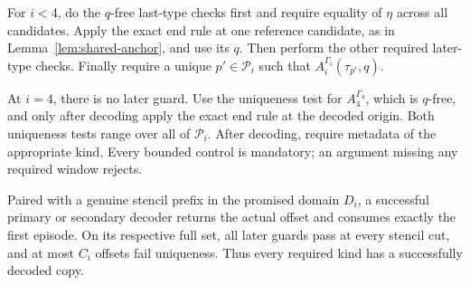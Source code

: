 For \(i<4\), do the \(q\)-free last-type checks first and require equality of
\(\eta\) across all candidates. Apply the exact end rule at one reference
candidate, as in Lemma~\ref{lem:shared-anchor}, and use its \(q\).
Then perform the other required later-type checks. Finally require a unique
\(p'\in\mathcal P_i\) such that \(A_i^{\Gamma_i}(\tau_{p'},q)\).

At \(i=4\), there is no later guard. Use the uniqueness test for
\(A_4^{\Gamma_4}\), which is \(q\)-free, and only after decoding apply the
exact end rule at the decoded origin. Both uniqueness tests range over all
of \(\mathcal P_i\). After decoding, require metadata of the appropriate
kind. Every bounded control is mandatory; an argument missing any required
window rejects.

\begin{lemma}\label{lem:time-decoder}
Paired with a genuine stencil prefix in the promised domain \(D_i\),
a successful primary or secondary decoder returns the actual offset and
consumes exactly the first episode.
On its respective full set, all later guards pass at every stencil cut,
and at most \(C_i\) offsets fail uniqueness. Thus every required kind has
a successfully decoded copy.
\end{lemma}

